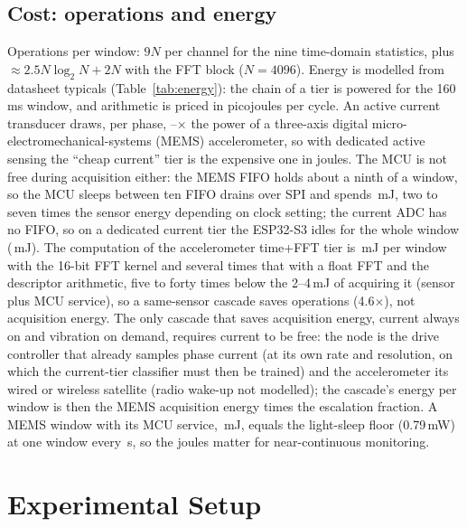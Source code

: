 \documentclass{ifacconf}
\begin{document}
\subsection{Cost: operations and energy}
Operations per window: $9N$ per channel for the nine time-domain statistics, plus $\approx 2.5N\log_2 N+2N$ with the FFT block ($N=4096$). Energy is modelled from datasheet typicals (Table~\ref{tab:energy}): the chain of a tier is powered for the 160\,ms window, and arithmetic is priced in picojoules per cycle. An active current transducer draws, per phase, \ratioTmcs--\energyRatio$\times$ the power of a three-axis digital micro-electromechanical-systems (MEMS) accelerometer, so with dedicated active sensing the ``cheap current'' tier is the expensive one in joules. The MCU is not free during acquisition either: the MEMS FIFO holds about a ninth of a window, so the MCU sleeps between ten FIFO drains over SPI and spends \mcuMemsMj\,mJ, two to seven times the sensor energy depending on clock setting; the current ADC has no FIFO, so on a dedicated current tier the ESP32-S3 idles for the whole window (\waitiMj\,mJ). The computation of the accelerometer time+FFT tier is \computeTot\,mJ per window with the 16-bit FFT kernel and several times that with a float FFT and the descriptor arithmetic, five to forty times below the 2--4\,mJ of acquiring it (sensor plus MCU service), so a same-sensor cascade saves operations (4.6$\times$), not acquisition energy. The only cascade that saves acquisition energy, current always on and vibration on demand, requires current to be free: the node is the drive controller that already samples phase current (at its own rate and resolution, on which the current-tier classifier must then be trained) and the accelerometer its wired or wireless satellite (radio wake-up not modelled); the cascade's energy per window is then the MEMS acquisition energy times the escalation fraction. A MEMS window with its MCU service, \memsTotMj\,mJ, equals the light-sleep floor (0.79\,mW) at one window every \breakEvenS\,s, so the joules matter for near-continuous monitoring.



\section{Experimental Setup}\label{sec:setup}
\end{document}

